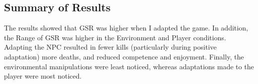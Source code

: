 \subsection{Summary of Results}
The results showed that GSR was higher when I adapted the game. In addition, the Range of GSR was higher in the Environment and Player conditions. Adapting the NPC resulted in fewer kills (particularly during positive adaptation) more deaths, and reduced competence and enjoyment. Finally, the environmental manipulations were least noticed, whereas adaptations made to the player were most noticed.




